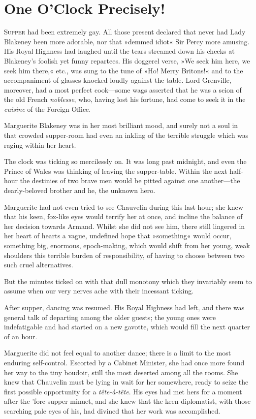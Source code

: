 
\chapter{One O'Clock Precisely!}
\lettrine[lines=4]{S}{upper} had been extremely gay. All those present declared that never had Lady Blakeney been more adorable, nor that »demmed idiot« Sir Percy more amusing. His Royal Highness had laughed until the tears streamed down his cheeks at Blakeney's foolish yet funny repartees. His doggerel verse, »We seek him here, we seek him there,« etc., was sung to the tune of »Ho! Merry Britons!« and to the accompaniment of glasses knocked loudly against the table. Lord Grenville, moreover, had a most perfect cook—some wags asserted that he was a scion of the old French \textit{noblesse}, who, having lost his fortune, had come to seek it in the \textit{cuisine} of the Foreign Office.

Marguerite Blakeney was in her most brilliant mood, and surely not a soul in that crowded supper-room had even an inkling of the terrible struggle which was raging within her heart.

The clock was ticking so mercilessly on. It was long past midnight, and even the Prince of Wales was thinking of leaving the supper-table. Within the next half-hour the destinies of two brave men would be pitted against one another—the dearly-beloved brother and he, the unknown hero.

Marguerite had not even tried to see Chauvelin during this last hour; she knew that his keen, fox-like eyes would terrify her at once, and incline the balance of her decision towards Armand. Whilst she did not see him, there still lingered in her heart of hearts a vague, undefined hope that »something« would occur, something big, enormous, epoch-making, which would shift from her young, weak shoulders this terrible burden of responsibility, of having to choose between two such cruel alternatives.

But the minutes ticked on with that dull monotony which they invariably seem to assume when our very nerves ache with their incessant ticking.

After supper, dancing was resumed. His Royal Highness had left, and there was general talk of departing among the older guests; the young ones were indefatigable and had started on a new gavotte, which would fill the next quarter of an hour.

Marguerite did not feel equal to another dance; there is a limit to the most enduring self-control. Escorted by a Cabinet Minister, she had once more found her way to the tiny boudoir, still the most deserted among all the rooms. She knew that Chauvelin must be lying in wait for her somewhere, ready to seize the first possible opportunity for a \textit{tête-à-tête}. His eyes had met hers for a moment after the 'fore-supper minuet, and she knew that the keen diplomatist, with those searching pale eyes of his, had divined that her work was accomplished.

